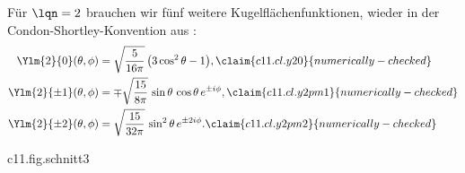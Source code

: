 \begin{vertiefung}[id=c11.v3,
    titel={Die Wellenfunktionen für $\nqn = 3$},
    wozu={Der Kern schreibt die Zustände bis $\nqn = 2$ aus. Hier stehen die neun
      Zustände zu $\nqn = 3$, darunter die ersten d-Zustände.},
    voraussetzung={Kern~\ref{c11.s5}; die allgemeine Formel aus
      Vertiefung~\ref{c11.v2} hilft, ist aber nicht nötig. Nicht nötig für die
      Abschnitte~\ref{c11.s6} und \ref{c11.s7}.},
    zurueck={Mit wachsendem $\nqn$ kommen Knoten hinzu, und die Funktionen reichen
      weiter nach außen. Die Bauart bleibt: Radialfunktion mal Funktion der Winkel.}]
  Für $\lqn = 2$ brauchen wir fünf weitere Kugelflächenfunktionen, wieder in der
  Condon-Shortley-Konvention aus :
  \begin{align}
    \Ylm{2}{0}(\theta, \phi) &= \sqrt{\frac{5}{16\pi}}\,\bigl(3\cos^2\theta - 1\bigr),
      \label{c11.eq.y20}\claim{c11.cl.y20}{numerically-checked} \\
    \Ylm{2}{\pm 1}(\theta, \phi) &= \mp\sqrt{\frac{15}{8\pi}}\,\sin\theta\,\cos\theta\,e^{\pm i\phi},
      \label{c11.eq.y2pm1}\claim{c11.cl.y2pm1}{numerically-checked} \\
    \Ylm{2}{\pm 2}(\theta, \phi) &= \sqrt{\frac{15}{32\pi}}\,\sin^2\theta\,e^{\pm 2i\phi}.
      \label{c11.eq.y2pm2}\claim{c11.cl.y2pm2}{numerically-checked}
  \end{align}

  \begin{tpcfigure}{c11.fig.schnitt3}
    \caption{Die Dichte $\abs{\psi}^2$ der Relativkoordinate für die d-Zustände mit $\nqn = 3$, als Schnitt durch die Ebene $y = 0$ und für $\Znuc = 1$, in derselben Darstellung wie Abbildung~\ref{c11.fig.schnitt}; alle drei Felder benutzen eine gemeinsame lineare Grauskala. Die Achsen sind Komponenten von $\posRel = \posE - \posP$.}
  \end{tpcfigure}


\end{vertiefung}
